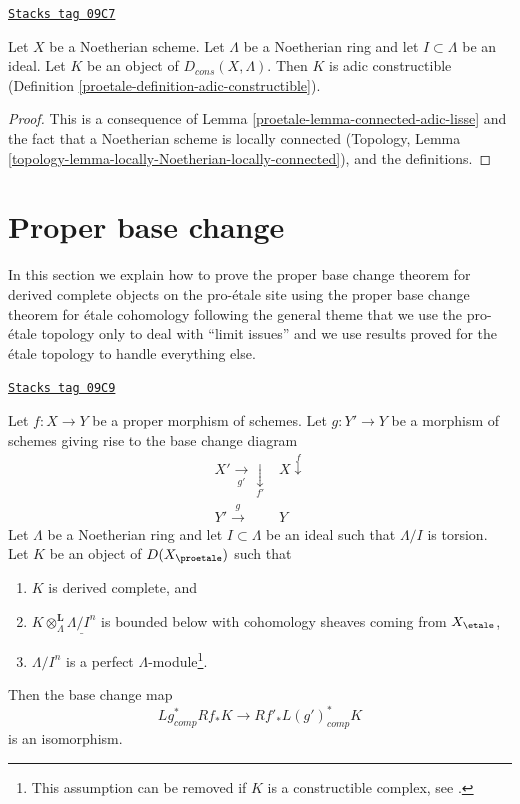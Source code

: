 \begin{proposition}
\label{proetale-proposition-Noetherian-adic-constructible}
\href{https://stacks.math.columbia.edu/tag/09C7}{\texttt{Stacks tag 09C7}}

Let $X$ be a Noetherian scheme. Let $\Lambda$ be a Noetherian ring and
let $I \subset \Lambda$ be an ideal. Let $K$ be an object of
$D_{cons}(X, \Lambda)$. Then $K$ is adic constructible
(Definition \ref{proetale-definition-adic-constructible}).
\end{proposition}

\begin{proof}

This is a consequence of Lemma \ref{proetale-lemma-connected-adic-lisse}
and the fact that a Noetherian scheme is locally connected
(Topology, Lemma \ref{topology-lemma-locally-Noetherian-locally-connected}),
and the definitions.
\end{proof}

\section{Proper base change}
\label{proetale-section-proper-base-change}
In this section we explain how to prove the proper base change theorem
for derived complete objects on the pro-\'etale site using the proper
base change theorem for \'etale cohomology following the general theme
that we use the pro-\'etale topology only to deal with ``limit issues''
and we use results proved for the \'etale topology to handle everything
else.

\begin{theorem}
\label{proetale-theorem-proper-base-change}
\href{https://stacks.math.columbia.edu/tag/09C9}{\texttt{Stacks tag 09C9}}

Let $f : X \to Y$ be a proper morphism of schemes. Let $g : Y' \to Y$ be
a morphism of schemes giving rise to the base change diagram
$$
\begin{array}{cc}X' \underset{g'}{\longrightarrow}\underset{f'}{\downarrow} & X \overset{f}{\downarrow} \\ Y' \overset{g}{\longrightarrow} & Y\end{array}
$$
Let $\Lambda$ be a Noetherian ring and let $I \subset \Lambda$ be an ideal
such that $\Lambda/I$ is torsion. Let $K$ be an object
of $D(X_\proetale)$ such that
\begin{enumerate}
\item $K$ is derived complete, and
\item $K \otimes_\Lambda^\mathbf{L} \underline{\Lambda/I^n}$ is
bounded below with cohomology sheaves coming from $X_\etale$,
\item $\Lambda/I^n$ is a perfect $\Lambda$-module\footnote{This assumption
can be removed if $K$ is a constructible complex, see \cite{BS}.}.
\end{enumerate}
Then the base change map
$$
Lg_{comp}^*Rf_*K \longrightarrow Rf'_*L(g')^*_{comp}K
$$
is an isomorphism.
\end{theorem}

